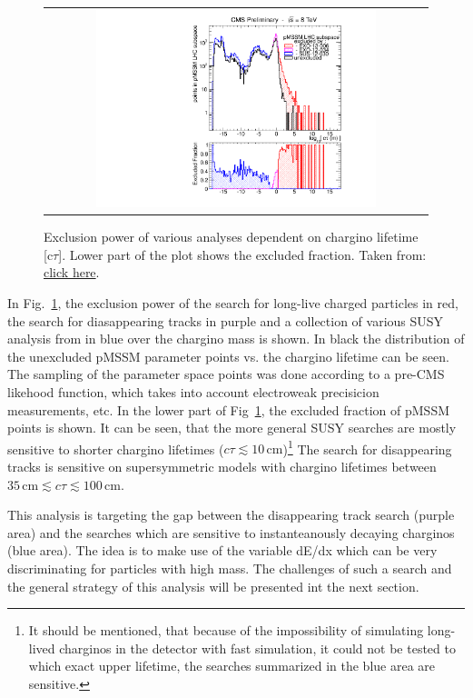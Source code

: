 \begin{figure}[!t]
  \centering 
  \begin{tabular}{c}
    \includegraphics[width=0.75\textwidth]{figures/analysis/pMSSM_vs_ctau.pdf}
  \end{tabular}
  \caption{Exclusion power of various analyses dependent on chargino lifetime [c$\tau$]. Lower part of the plot shows the excluded fraction. Taken from: \href{https://twiki.cern.ch/twiki/bin/view/CMSPublic/PhysicsResultsEXO12034}{click here}.}
  \label{fig:pMSSMplot}
\end{figure}
In Fig.~\ref{fig:pMSSMplot}, the exclusion power of the search for long-live charged particles \cite{bib:CMS:HSCP_8TeV} in red, the search for diasappearing tracks \cite{bib:CMS:DT_8TeV} in purple and a collection of various SUSY analysis from \cite{bib:CMS:pMSSMinterpretation_7TeV_PAS} in blue over the chargino mass is shown. 
In black the distribution of the unexcluded pMSSM parameter points vs. the chargino lifetime can be seen.
The sampling of the parameter space points was done according to a pre-CMS likehood function, which takes into account electroweak precisicion measurements, etc.
In the lower part of Fig~\ref{fig:pMSSMplot}, the excluded fraction of pMSSM points is shown. 
It can be seen, that the more general SUSY searches are mostly sensitive to shorter chargino lifetimes ($c\tau \lesssim 10 \,\text{cm}$)\footnote{It should be mentioned, that because of the impossibility of simulating long-lived charginos in the detector with fast simulation, it could not be tested to which exact upper lifetime, the searches summarized in the blue area are sensitive.}
The search for disappearing tracks is sensitive on supersymmetric models with chargino lifetimes between $35\,\text{cm} \lesssim c\tau \lesssim 100\,\text{cm}$.

This analysis is targeting the gap between the disappearing track search (purple area) and the searches which are sensitive to instanteanously decaying charginos (blue area). 
The idea is to make use of the variable dE/dx which can be very discriminating for particles with high mass.
The challenges of such a search and the general strategy of this analysis will be presented int the next section.

